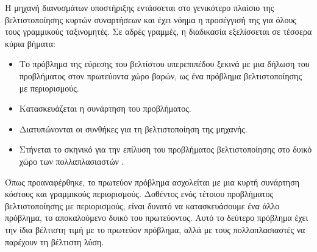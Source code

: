 Η μηχανή διανυσμάτων υποστήριξης εντάσσεται στο γενικότερο πλαίσιο της βελτιστοποίησης κυρτών συναρτήσεων και έχει νόημα η προσέγγισή της για όλους τους γραμμικούς ταξινομητές. Σε αδρές γραμμές, η διαδικασία εξελίσσεται σε τέσσερα κύρια βήματα:
\begin{itemize}
\item Το πρόβλημα της εύρεσης του βελτίστου υπερεπιπέδου ξεκινά με μια δήλωση του προβλήματος στον πρωτεύοντα χώρο βαρών, ως ένα πρόβλημα βελτιστοποίησης με περιορισμούς.
\item Κατασκευάζεται η συνάρτηση  του προβλήματος.
\item Διατυπώνονται οι συνθήκες για τη βελτιστοποίηση της μηχανής.
\item Στήνεται το σκηνικό για την επίλυση του προβλήματος βελτιστοποίησης στο δυικό χώρο των πολλαπλασιαστών .
\end{itemize}
Όπως προαναφέρθηκε, το πρωτεύον πρόβλημα ασχολείται με μια κυρτή συνάρτηση κόστους και γραμμικούς περιορισμούς. Δοθέντος ενός τέτοιου προβλήματος βελτιστοποίησης με περιορισμούς, είναι δυνατό να κατασκευάσουμε ένα άλλο πρόβλημα, το αποκαλούμενο δυικό του πρωτεύοντος. Αυτό το δεύτερο πρόβλημα έχει την ίδια βέλτιστη τιμή με το πρωτεύον πρόβλημα, αλλά με τους πολλαπλασιαστές  να παρέχουν τη βέλτιστη λύση\cite{haykin}.
